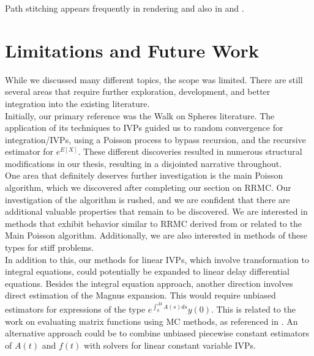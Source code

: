 \documentclass[a4paper,12pt]{article}
\begin{document}
\begin{related}
  Path stitching appears frequently in rendering and also in \cite{das_sarma_fast_2015}
  and \cite{ji_reusing_2012}.
\end{related}


\newpage

\section{Limitations and Future Work}

While we discussed many different topics, the scope was limited.
There are still several areas that require further exploration,
development, and better integration into the existing literature. \\

Initially, our primary reference was the Walk on Spheres literature.
The application of its techniques to IVPs guided us to random
convergence for integration/IVPs, using a Poisson process to
bypass recursion, and the recursive estimator for $e^{E[X]}$. These different discoveries resulted in numerous structural modifications in our thesis, resulting in a disjointed narrative throughout. \\

One area that definitely deserves further investigation is the main Poisson algorithm, which we discovered after completing our section on RRMC. Our investigation of the algorithm is rushed, and we are confident that there are additional valuable properties that remain to be discovered. We are interested in methods that exhibit behavior similar to RRMC derived from or related to the Main Poisson algorithm. Additionally, we are also interested in methods of these types for stiff problems. \\

In addition to this, our methods for linear IVPs, which involve transformation to integral equations, could potentially be expanded to linear delay differential equations. Besides the integral equation approach, another direction involves direct estimation of the Magnus expansion. This would require unbiased estimators for expressions of the type $e^{\int_{0}^{\Delta t} A(s)ds} y(0)$. This is related to the work on evaluating matrix functions using MC methods, as referenced in \cite{guidotti_fast_2023}. An alternative approach could be to combine unbiased piecewise constant estimators of $A(t)$ and $f(t)$ with solvers for linear constant variable IVPs. \\
\end{document}
